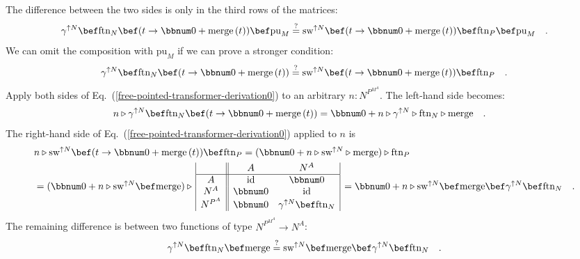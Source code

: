 The difference between the two sides is only in the third rows of
the matrices:
\[
\gamma^{\uparrow N}\bef\text{ftn}_{N}\bef(t\rightarrow\bbnum 0+\text{merge}\,(t))\bef\text{pu}_{M}\overset{?}{=}\text{sw}^{\uparrow N}\bef(t\rightarrow\bbnum 0+\text{merge}\,(t))\bef\text{ftn}_{P}\bef\text{pu}_{M}\quad.
\]
We can omit the composition with $\text{pu}_{M}$ if we can prove
a stronger condition:
\begin{equation}
\gamma^{\uparrow N}\bef\text{ftn}_{N}\bef(t\rightarrow\bbnum 0+\text{merge}\,(t))\overset{?}{=}\text{sw}^{\uparrow N}\bef(t\rightarrow\bbnum 0+\text{merge}\,(t))\bef\text{ftn}_{P}\quad.\label{free-pointed-transformer-derivation0}
\end{equation}
Apply both sides of Eq.~(\ref{free-pointed-transformer-derivation0})
to an arbitrary $n:N^{P^{M^{A}}}$. The left-hand side becomes:
\begin{align*}
 & n\triangleright\gamma^{\uparrow N}\bef\text{ftn}_{N}\bef(t\rightarrow\bbnum 0+\text{merge}\,(t))=\bbnum 0+n\triangleright\gamma^{\uparrow N}\triangleright\text{ftn}_{N}\triangleright\text{merge}\quad.
\end{align*}
The right-hand side of Eq.~(\ref{free-pointed-transformer-derivation0})
applied to $n$ is
\begin{align*}
 & n\triangleright\text{sw}^{\uparrow N}\bef(t\rightarrow\bbnum 0+\text{merge}\,(t))\bef\text{ftn}_{P}=(\bbnum 0+n\triangleright\text{sw}^{\uparrow N}\triangleright\text{merge})\triangleright\text{ftn}_{P}\\
 & =(\bbnum 0+n\triangleright\text{sw}^{\uparrow N}\bef\text{merge})\triangleright\,\begin{array}{|c||cc|}
 & A & N^{A}\\
\hline A & \text{id} & \bbnum 0\\
N^{A} & \bbnum 0 & \text{id}\\
N^{P^{A}} & \bbnum 0 & \gamma^{\uparrow N}\bef\text{ftn}_{N}
\end{array}\,=\bbnum 0+n\triangleright\text{sw}^{\uparrow N}\bef\text{merge}\bef\gamma^{\uparrow N}\bef\text{ftn}_{N}\quad.
\end{align*}
The remaining difference is between two functions of type $N^{P^{M^{A}}}\rightarrow N^{A}$:
\begin{equation}
\gamma^{\uparrow N}\bef\text{ftn}_{N}\bef\text{merge}\overset{?}{=}\text{sw}^{\uparrow N}\bef\text{merge}\bef\gamma^{\uparrow N}\bef\text{ftn}_{N}\quad.\label{eq:free-pointed-transformer-derivation1}
\end{equation}
